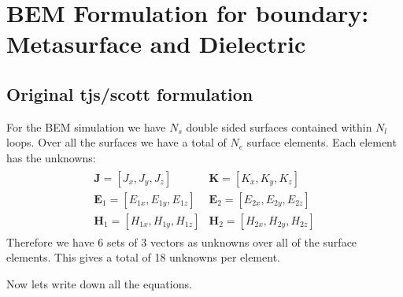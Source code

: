 \documentclass{article}
\newcommand{\E}{\mathbf{E}}
\renewcommand{\H}{\mathbf{H}}
\newcommand{\J}{\mathbf{J}}
\renewcommand{\H}{\mathbf{H}}
\newcommand{\K}{\mathbf{K}}
\newcommand{\0}{\varnothing}
\begin{document}
\section{BEM Formulation for boundary: Metasurface and Dielectric}

\subsection{Original tjs/scott formulation}

For the BEM simulation we have $N_s$ double sided surfaces contained within $N_l$ loops. Over all the surfaces we have a total of $N_e$ surface elements. Each element has the unknowns:
\begin{align*}
    \begin{array}{ll}
    \J = [J_{x},J_{y},J_{z}] & \K = [K_{x},K_{y},K_{z}] \\
    \E_{1} = [E_{1x},E_{1y},E_{1z}] & \E_{2} = [E_{2x},E_{2y},E_{2z}] \\
    \H_{1} = [H_{1x},H_{1y},H_{1z}] & \H_{2} = [H_{2x},H_{2y},H_{2z}]
    \end{array}
\end{align*}
Therefore we have 6 sets of 3 vectors as unknowns over all of the surface elements. This gives a total of 18 unknowns per element.  

Now lets write down all the equations.
\end{document}
